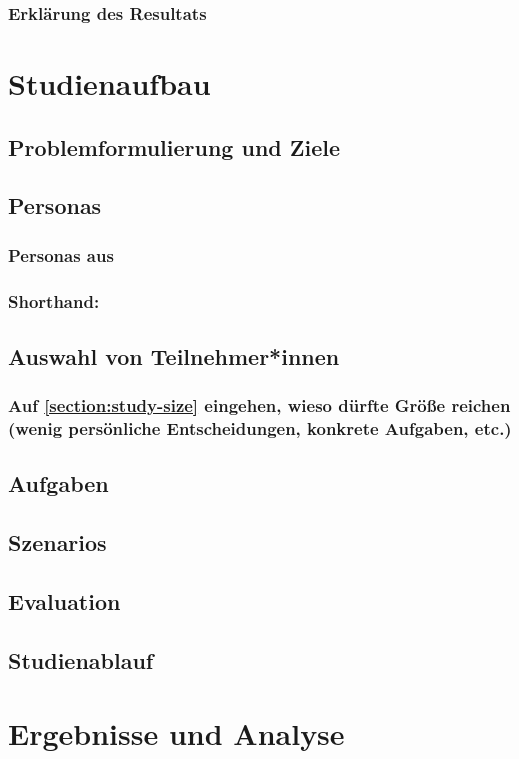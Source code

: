 \documentclass[oneside,a4paper,11pt,openright]{report}
\begin{document}
\subsubsection{Erklärung des Resultats}
\section{Studienaufbau}
\subsection{Problemformulierung und Ziele}
\subsection{Personas}
\subsubsection{Personas aus }
\subsubsection{Shorthand: }
\subsection{Auswahl von Teilnehmer*innen}
\subsubsection{Auf \ref{section:study-size} eingehen, wieso dürfte Größe reichen (wenig persönliche Entscheidungen, konkrete Aufgaben, etc.)}
\subsection{Aufgaben}
\subsection{Szenarios}
\subsection{Evaluation}
\subsection{Studienablauf}
\section{Ergebnisse und Analyse}
\end{document}
